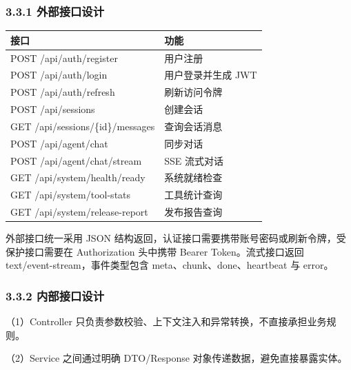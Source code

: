 \documentclass[UTF8]{ctexart}
\begin{document}
\subsubsection{\texorpdfstring{\textbf{3.3.1
外部接口设计}}{3.3.1 外部接口设计}}\label{ux5916ux90e8ux63a5ux53e3ux8bbeux8ba1}

\begin{longtable}[]{@{}
  >{\raggedright\arraybackslash}p{}
  >{\raggedright\arraybackslash}p{}@{}}
\toprule\noalign{}
\begin{minipage}[b]{\linewidth}\raggedright
接口
\end{minipage} & \begin{minipage}[b]{\linewidth}\raggedright
功能
\end{minipage} \\
\midrule\noalign{}
\endhead
\bottomrule\noalign{}
\endlastfoot
POST /api/auth/register & 用户注册 \\
POST /api/auth/login & 用户登录并生成 JWT \\
POST /api/auth/refresh & 刷新访问令牌 \\
POST /api/sessions & 创建会话 \\
GET /api/sessions/\{id\}/messages & 查询会话消息 \\
POST /api/agent/chat & 同步对话 \\
POST /api/agent/chat/stream & SSE 流式对话 \\
GET /api/system/health/ready & 系统就绪检查 \\
GET /api/system/tool-stats & 工具统计查询 \\
GET /api/system/release-report & 发布报告查询 \\
\end{longtable}

外部接口统一采用 JSON
结构返回，认证接口需要携带账号密码或刷新令牌，受保护接口需要在
Authorization 头中携带 Bearer Token。流式接口返回
text/event-stream，事件类型包含 meta、chunk、done、heartbeat 与 error。

\subsubsection{\texorpdfstring{\textbf{3.3.2
内部接口设计}}{3.3.2 内部接口设计}}\label{ux5185ux90e8ux63a5ux53e3ux8bbeux8ba1}

（1）Controller
只负责参数校验、上下文注入和异常转换，不直接承担业务规则。

（2）Service 之间通过明确 DTO/Response 对象传递数据，避免直接暴露实体。
\end{document}
